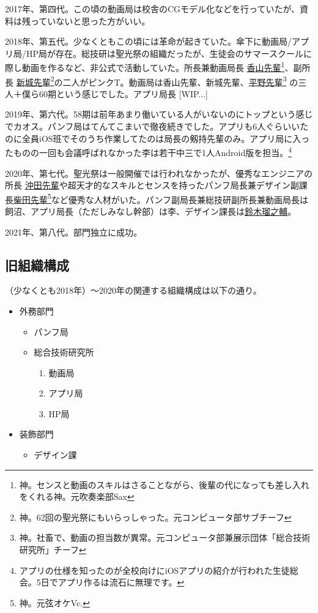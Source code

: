\documentclass[a4paper]{ltjsreport}
\newcommand{\mail}[2]{\href{mailto:#2}{#1}}
\begin{document}
2017年、第四代。この頃の動画局は校舎のCGモデル化などを行っていたが、資料は残っていないと思った方がいい。

2018年、第五代。少なくともこの頃には革命が起きていた。傘下に動画局/アプリ局/HP局が存在。総技研は聖光祭の組織だったが、生徒会のサマースクールに際し動画を作るなど、非公式で活動していた。所長兼動画局長 \mail{香山先輩}{57084koyama@seiko.ac.jp}\footnote{神。センスと動画のスキルはさることながら、後輩の代になっても差し入れをくれる神。元吹奏楽部Sax}、副所長 \mail{新城先輩}{57011araki@seiko.ac.jp}\footnote{神。62回の聖光祭にもいらっしゃった。元コンピュータ部サブチーフ}の二人がピンクT。動画局は香山先輩、新城先輩、\mail{平野先輩}{57174hirano@seiko.ac.jp}\footnote{ 神。社畜で、動画の担当数が異常。元コンピュータ部兼展示団体「総合技術研究所」チーフ} の三人＋僕ら60期という感じでした。アプリ局長 [WIP...]

2019年、第六代。58期は前年あまり働いている人がいないのにトップという感じでカオス。パンフ局はてんてこまいで徹夜続きでした。アプリも6人ぐらいいたのに全員iOS班でそのうち作業してたのは局長の剱持先輩のみ。アプリ局に入ったものの一回も会議呼ばれなかった李は若干中三で1人Android版を担当。\footnote{アプリの仕様を知ったのが全校向けにiOSアプリの紹介が行われた生徒総会。5日でアプリ作るは流石に無理です。}

2020年、第七代。聖光祭は一般開催では行われなかったが、優秀なエンジニアの所長 \mail{沖田先輩}{59039okita@seiko.ac.jp}や超天才的なスキルとセンスを持ったパンフ局長兼デザイン副課長\mail{柴田先輩}{59091shibataseiko.ac.jp}\footnote{神。元弦オケVc.}など優秀な人材がいた。パンフ副局長兼総技研副所長兼動画局長は飼沼、アプリ局長（ただしみなし幹部）は李、デザイン課長は\mail{鈴木瑠之輔}{60111suzuki@seiko.ac.jp}。

2021年、第八代。部門独立に成功。

\subsection{旧組織構成}
（少なくとも2018年）〜2020年の関連する組織構成は以下の通り。
\begin{itemize}
  \item 外務部門
        \begin{itemize}
          \item パンフ局
          \item 総合技術研究所
                \begin{enumerate}[−]
                  \item 動画局
                  \item アプリ局
                  \item HP局
                \end{enumerate}
        \end{itemize}
  \item 装飾部門
        \begin{itemize}
          \item デザイン課
        \end{itemize}
\end{itemize}
\end{document}
